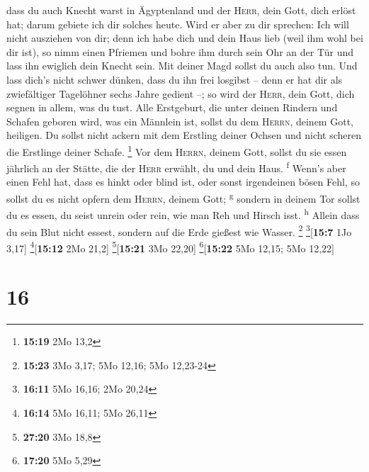 dass du auch Knecht warst in Ägyptenland und der \textsc{Herr}, dein
Gott, dich erlöst hat; darum gebiete ich dir solches heute.
 Wird er aber zu dir sprechen: Ich will nicht ausziehen
von dir; denn ich habe dich und dein Haus lieb (weil ihm wohl bei dir
ist),  so nimm einen Pfriemen und bohre ihm durch sein
Ohr an der Tür und lass ihn ewiglich dein Knecht sein. Mit deiner Magd
sollst du auch also tun.  Und lass dich's nicht schwer
dünken, dass du ihn frei losgibst -- denn er hat dir als zwiefältiger
Tagelöhner sechs Jahre gedient --; so wird der \textsc{Herr}, dein Gott,
dich segnen in allem, was du tust.  Alle Erstgeburt, die
unter deinen Rindern und Schafen geboren wird, was ein Männlein ist,
sollst du dem \textsc{Herrn}, deinem Gott, heiligen. Du sollst nicht
ackern mit dem Erstling deiner Ochsen und nicht scheren die Erstlinge
deiner Schafe. \footnote{\textbf{15:19} 2Mo 13,2}  Vor
dem \textsc{Herrn}, deinem Gott, sollst du sie essen jährlich an der
Stätte, die der \textsc{Herr} erwählt, du und dein Haus.
\textsuperscript{f}  Wenn's aber einen Fehl hat, dass es
hinkt oder blind ist, oder sonst irgendeinen bösen Fehl, so sollst du es
nicht opfern dem \textsc{Herrn}, deinem Gott; \textsuperscript{g}
 sondern in deinem Tor sollst du es essen, du seist
unrein oder rein, wie man Reh und Hirsch isst. \textsuperscript{h}
 Allein dass du sein Blut nicht essest, sondern auf die
Erde gießest wie Wasser. \footnote{\textbf{15:23} 3Mo 3,17; 5Mo 12,16;
  5Mo 12,23-24} \footnote{\textbf{16:11} 5Mo 16,16; 2Mo 20,24}{[}\textbf{15:7}
1Jo 3,17{]} \footnote{\textbf{16:14} 5Mo 16,11; 5Mo 26,11}{[}\textbf{15:12}
2Mo 21,2{]} \footnote{\textbf{27:20} 3Mo 18,8}{[}\textbf{15:21} 3Mo
22,20{]} \footnote{\textbf{17:20} 5Mo 5,29}{[}\textbf{15:22} 5Mo 12,15;
5Mo 12,22{]}

\hypertarget{section-15}{%
\section{16}\label{section-15}}

